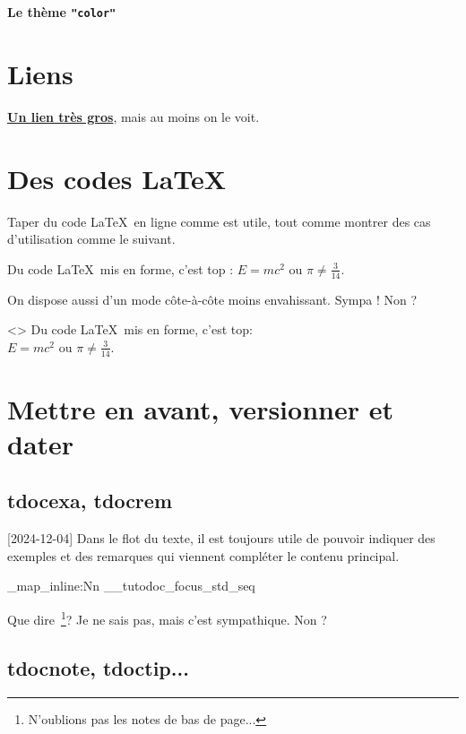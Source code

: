 \documentclass[theme = color]{../main/main}
\newcommand\thisstyle{color}
\newcommand\myexrmktext{
    \tdocversion{1.7.0}[2024-12-04]
    Dans le flot du texte, il est toujours utile de pouvoir indiquer des exemples et des remarques qui viennent compléter le contenu principal.
}
\newcommand\myhighlightedtext{
    Que dire\,%
    \footnote{
        N'oublions pas les notes de bas de page...
    }?
    Je ne sais pas, mais c'est sympathique. Non ?
}
\begin{document}
\textsf{\Huge\bfseries Le thème \texttt{"\thisstyle"}}

\section{Liens}

{\Large\bfseries \href{https://github.com/bc-tools/for-latex/tree/main/tutodoc}{Un lien très gros}}, mais au moins on le voit.



\section{Des codes \LaTeX}

Taper du code \LaTeX\ en ligne comme  est utile, tout comme montrer des cas d'utilisation comme le suivant.

\begin{tdoclatex}
Du code \LaTeX\ mis en forme, c'est top : $E = m c^2$ ou $\pi \neq \frac{3}{14}$.
\end{tdoclatex}


On dispose aussi d'un mode côte-à-côte moins envahissant. Sympa ! Non ?

\begin{tdoclatex}<>
Du code \LaTeX\ mis en forme, c'est top: \\
$E = m c^2$ ou $\pi \neq \frac{3}{14}$.
\end{tdoclatex}



\section{Mettre en avant, versionner et dater}

\subsection{tdocexa, tdocrem}

\myexrmktext

\ExplSyntaxOn

\seq_map_inline:Nn \g__tutodoc_focus_std_seq {
    \begin{tdoc#1}
        \myhighlightedtext
    \end{tdoc#1}
}

\ExplSyntaxOff



\subsection{tdocnote, tdoctip...}
\end{document}
